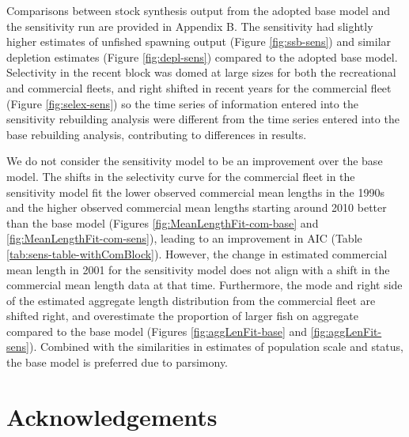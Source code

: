 \documentclass[11pt,
  english,
  a4paper,
]{article}
\begin{document}
\leavevmode\tagmcend\tagstructend\par


Comparisons between stock synthesis output from the adopted base model and the sensitivity run are provided in \protect\hypertarget{append_b}{}{Appendix B}. The sensitivity had slightly higher estimates of unfished spawning output (Figure \ref{fig:ssb-sens}) and similar depletion estimates (Figure \ref{fig:depl-sens}) compared to the adopted base model. Selectivity in the recent block was domed at large sizes for both the recreational and commercial fleets, and right shifted in recent years for the commercial fleet (Figure \ref{fig:selex-sens}) so the time series of information entered into the sensitivity rebuilding analysis were different from the time series entered into the base rebuilding analysis, contributing to differences in results.

\leavevmode\tagmcend\tagstructend\par


We do not consider the sensitivity model to be an improvement over the base model. The shifts in the selectivity curve for the commercial fleet in the sensitivity model fit the lower observed commercial mean lengths in the 1990s and the higher observed commercial mean lengths starting around 2010 better than the base model (Figures \ref{fig:MeanLengthFit-com-base} and \ref{fig:MeanLengthFit-com-sens}), leading to an improvement in AIC (Table \ref{tab:sens-table-withComBlock}). However, the change in estimated commercial mean length in 2001 for the sensitivity model does not align with a shift in the commercial mean length data at that time. Furthermore, the mode and right side of the estimated aggregate length distribution from the commercial fleet are shifted right, and overestimate the proportion of larger fish on aggregate compared to the base model (Figures \ref{fig:aggLenFit-base} and \ref{fig:aggLenFit-sens}). Combined with the similarities in estimates of population scale and status, the base model is preferred due to parsimony.

\leavevmode\tagmcend\tagstructend\par


\hypertarget{acknowledgements}{%
\section{Acknowledgements}\label{acknowledgements}}
\end{document}
